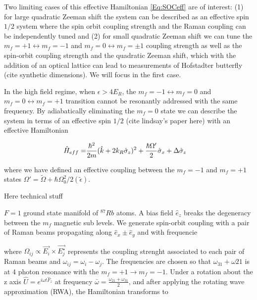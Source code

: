 Two limiting cases of this effective Hamiltonian \ref{Eq:SOCeff} are of interest: (1) for large quadratic Zeeman shift the system can be described as an effective spin $1/2$ system where the spin orbit coupling strength and the Raman coupling can be independently tuned and (2) for small quadratic Zeeman shift we can tune the $m_f=+1\leftrightarrow m_f=-1$ and $m_f=0\leftrightarrow m_f=\pm 1$ coupling strength as well as the spin-orbit coupling strength and the quadratic Zeeman shift, which with the addition of an optical lattice can lead to  measurements of Hofstadter butterfly (cite synthetic dimensions). We will focus in the first case. 


In the high field regime, when $\epsilon > 4E_R$, the $m_f=-1\leftrightarrow m_f=0$ and $m_f=0 \leftrightarrow m_f=+1$ transition cannot be resonantly addressed with the same frequency. By adiabatically eliminating the $m_f=0$ state we can describe the system in terms of an effective spin $1/2$ (cite lindsay's paper here) with an effective Hamiltonian

\begin{align}
	\begin{split}
		\hat{H}_{eff} = & \frac{\hbar^2}{2m}(\hat{k}+2{{k_R}}\hat{\sigma}_z)^2 + \frac{\hbar\Omega'}{2}\hat{\sigma}_x  +\Delta\hat{\sigma}_z  
	\label{Eq:SOChalf}
	\end{split}
\end{align}	
 
where we have defined an effective coupling between the $m_f=-1$ and $m_f=+1$ states $\Omega'=\tilde{\Omega}+\hbar\Omega_0^2/2(\tilde{\epsilon})$. 






Here technical stuff

$F=1$ ground state manifold of $^87Rb$ atoms. A bias field $\hat{e}_z$ breaks the degeneracy between the $m_f$ magnetic sub levels. We generate spin-orbit coupling with a pair of Raman beams propagating along $\hat{e}_x \pm \hat{e}_y$ and with frequencie


%
%
where $\Omega_{ij}\propto \vec{E_i}\times\vec{E_j^{\star}}$ represents the coupling strenght associated to each pair of Raman beams and $\omega_{ij} = \omega_{i}-\omega_{j} $. The frequencies are chosen so that $\omega_{31} + \omega{21}$ is at 4 photon resonance with the $m_f = +1\rightarrow m_f = -1$. Under a rotation about the z axis $\hat{U} = e^{i\omega t\hat{F}_z}$ at frequency $\bar{\omega} = \frac{\omega_{21}+\omega_{31}}{2}$, and after applying the rotating wave approximation (RWA), the Hamiltonian transforms to 

